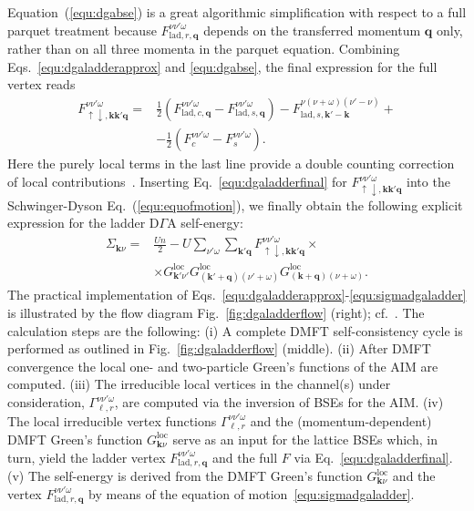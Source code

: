 \documentclass[rmp,aps,reprint,amsmath,amssymb,superscriptaddress,showpacs,nofootinbib]{revtex4-1}
\begin{document}
Equation~(\ref{equ:dgabse}) is a great algorithmic simplification with respect to  a full parquet treatment because $F_{\text{lad},r,\mathbf{q}}^{\nu\nu'\omega}$ depends on the transferred momentum $\mathbf{q}$ only, rather than on all three momenta in the parquet equation.
Combining Eqs.~\eqref{equ:dgaladderapprox} and \eqref{equ:dgabse}, the final expression for the full vertex reads
\begin{align}
\label{equ:dgaladderfinal}
 F_{\uparrow\downarrow,\mathbf{k}\mathbf{k}'\mathbf{q}}^{\nu\nu'\omega}=&\frac{1}{2}\left(F_{\text{lad},c,\mathbf{q}}^{\nu\nu'\omega}\right.\left.\!-\!F_{\text{lad},s,\mathbf{q}}^{\nu\nu'\omega}\right)-F_{\text{lad},s,\mathbf{k}'-\mathbf{k}}^{\nu(\nu+\omega)(\nu'-\nu)}+\nonumber\\&-\frac{1}{2}\left(F_{c}^{\nu\nu'\omega}\!-\!F_{s}^{\nu\nu'\omega}\right).
\end{align}
Here the purely local terms in the last line provide a double counting correction of local contributions~\cite{Toschi2007,Rohringer2013a}. Inserting Eq.~\eqref{equ:dgaladderfinal} for $F_{\uparrow\downarrow,\mathbf{k}\mathbf{k}'\mathbf{q}}^{\nu\nu'\omega}$ into the Schwinger-Dyson Eq.~(\ref{equ:equofmotion}), we finally obtain the following explicit expression for the ladder D$\Gamma$A self-energy:  
\begin{align}
\label{equ:sigmadgaladder}
 \Sigma_{\mathbf{k}\nu}=&\frac{Un}{2}-{U}\sum_{\nu'\omega}\sum_{\mathbf{k}'\mathbf{q}}F_{\uparrow\downarrow,\mathbf{k}\mathbf{k}'\mathbf{q}}^{\nu\nu'\omega}\times\nonumber\\&\times G_{\mathbf{k}'\nu'}^{\text{loc}}G^{\text{loc}}_{(\mathbf{k}'+\mathbf{q})(\nu'+\omega)}G^{\text{loc}}_{(\mathbf{k}+\mathbf{q})(\nu+\omega)}.
\end{align}
The practical implementation of Eqs.~\eqref{equ:dgaladderapprox}-\eqref{equ:sigmadgaladder} is illustrated by the flow diagram Fig.~\ref{fig:dgaladderflow} (right); cf.\ .  The calculation steps are the following: (i) A complete DMFT self-consistency cycle is performed as outlined in Fig.~\ref{fig:dgaladderflow} (middle). (ii) After  DMFT convergence the local one- and two-particle Green's functions of the AIM are computed. (iii) The irreducible local vertices in the channel(s) under consideration, $\Gamma_{\ell,r}^{\nu\nu'\omega}$, are computed via the inversion of BSEs for the AIM. (iv) The  local irreducible vertex functions $\Gamma_{\ell,r}^{\nu\nu'\omega}$ and the (momentum-dependent) DMFT Green's function $G^{\text{loc}}_{\mathbf{k}\nu}$ serve as an input for the lattice BSEs which, in turn, yield the ladder vertex $F_{\text{lad},r,\mathbf{q}}^{\nu\nu'\omega}$ and the full $F$ via Eq.~\eqref{equ:dgaladderfinal}. (v) The self-energy is derived from the DMFT Green's function $G^{\text{loc}}_{\mathbf{k}\nu}$ and the vertex $F_{\text{lad},r,\mathbf{q}}^{\nu\nu'\omega}$ by means of the equation of motion~\eqref{equ:sigmadgaladder}. 
\end{document}
